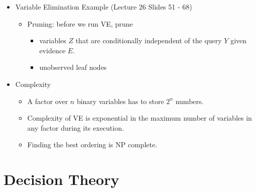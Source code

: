 \documentclass{article}
\begin{document}
\begin{itemize}
\begin{enumerate}
        \end{enumerate}
    \item Variable Elimination Example (Lecture 26 Slides 51 - 68)
        \begin{itemize}
            \item Pruning: before we run VE, prune
                \begin{itemize}
                    \item variables $Z$ that are conditionally independent of the query $Y$ given evidence $E$.
                    \item unobserved leaf nodes
                \end{itemize}
        \end{itemize}
    \item Complexity
        \begin{itemize}
            \item A factor over $n$ binary variables has to store $2^n$ numbers.
            \item Complexity of VE is exponential in the maximum number of variables in any factor during its execution.
            \item Finding the best ordering is NP complete.
        \end{itemize}
\end{itemize}

\section{Decision Theory}
\end{document}
